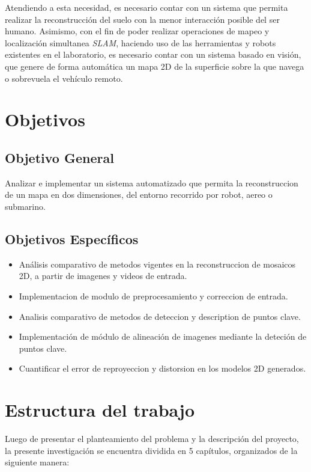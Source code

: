 Atendiendo a esta necesidad, es necesario contar con un sistema que permita realizar la reconstrucción del suelo con la menor interacción posible del ser humano. Asimismo, con el fin de poder realizar operaciones de mapeo y localización simultanea \textit{SLAM}, haciendo uso de las herramientas y robots existentes en el laboratorio, es necesario contar con un sistema basado en visión, que genere de forma automática un mapa 2D de la superficie sobre la que navega o sobrevuela el vehículo remoto.


\section{Objetivos}

\subsection{Objetivo General}

Analizar e implementar un sistema automatizado que permita la reconstruccion de un mapa en dos dimensiones, del entorno recorrido por robot, aereo o submarino.

\subsection{Objetivos Específicos}

\begin{itemize}
	\item Análisis comparativo de metodos vigentes en la reconstruccion de mosaicos 2D, a partir de imagenes y videos de entrada.
	\item Implementacion de modulo de preprocesamiento y correccion de entrada.
	\item Analisis comparativo de metodos de deteccion y description de puntos clave.
	\item Implementación de módulo de alineación de imagenes mediante la deteción de puntos clave.
	\item Cuantificar el error de reproyeccion y distorsion en los modelos 2D generados.
\end{itemize}

\section{Estructura del trabajo}

Luego de presentar el planteamiento del problema y la descripción del proyecto, la presente investigación se encuentra dividida en 5 capítulos, organizados de la siguiente manera:

